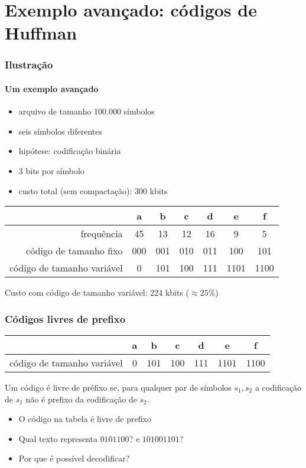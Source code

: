 \documentclass{beamer}
\begin{document}
\section{Exemplo avançado: códigos de Huffman}
\begin{frame}
\frametitle{Ilustração}
\framesubtitle{Um exemplo avançado}

\begin{itemize}
\item arquivo de tamanho 100.000 símbolos
\item seis símbolos diferentes
\item hipótese: codificação binária
\item 3 bits por símbolo
\item custo total (sem compactação): 300 kbits
\end{itemize}
\pause
\begin{center}
\begin{tabular}{r|c|c|c|c|c|c|}
& a & b & c & d & e & f \\
\hline
frequência & 45 & 13 & 12 & 16 & 9 & 5 \\
código de tamanho fixo & 000 & 001 & 010 & 011 & 100 & 101 \\
código de tamanho variável & 0 & 101 & 100 & 111 & 1101 & 1100
\end{tabular}
Custo com código de tamanho variável: 224 kbits ($\approx 25\%$)
\end{center}
\end{frame}


\begin{frame}
\frametitle{Códigos livres de prefixo}

\begin{center}
\begin{tabular}{r|c|c|c|c|c|c|}
& a & b & c & d & e & f \\
\hline
código de tamanho variável & 0 & 101 & 100 & 111 & 1101 & 1100
\end{tabular}
\end{center}

\begin{definition}
Um código é livre de préfixo se, para qualquer par de símbolos $s_1, s_2$
a codificação de $s_1$ não é prefixo da codificação de $s_2$.
\end{definition}

\begin{itemize}
\item O código na tabela é livre de prefixo
\item Qual texto representa $0101100$? e $101001101$?
\item Por que é possível decodificar?
\end{itemize}
\end{frame}
\end{document}
